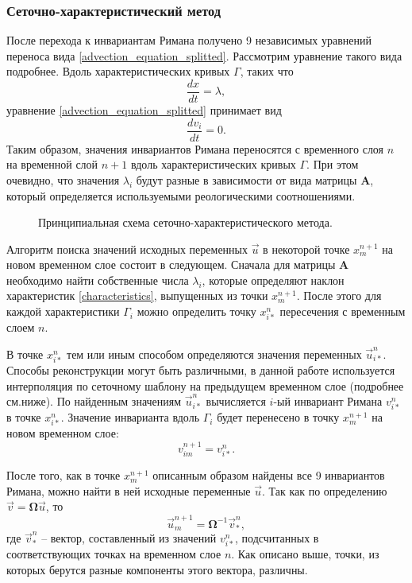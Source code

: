 \subsubsection{Сеточно-характеристический метод}
\label{sec:gcm_method_idea}

После перехода к инвариантам Римана получено 9 независимых уравнений переноса вида \ref{advection_equation_splitted}. Рассмотрим уравнение такого вида подробнее. Вдоль характеристических кривых $\Gamma$, таких что
\begin{equation}
\label{characteristics}
\frac{dx}{dt} = \lambda,
\end{equation}
уравнение \ref{advection_equation_splitted} принимает вид 
\begin{equation}
\label{characteristic_equation}
\frac{dv_i}{dt} = 0.
\end{equation}
Таким образом, значения инвариантов Римана переносятся с временного слоя $n$ на временной слой $n+1$ вдоль характеристических кривых $\Gamma$. При этом очевидно, что значения $\lambda_i$ будут разные в зависимости от вида матрицы $\mathbf A$, который определяется используемыми реологическими соотношениями.

\begin{figure}[h]
\caption{Принципиальная схема сеточно-характеристического метода.}
\end{figure}

Алгоритм поиска значений исходных переменных $\vec u$ в некоторой точке $x_m^{n+1}$ на новом временном слое состоит в следующем. Сначала для матрицы $\mathbf A$ необходимо найти собственные числа $\lambda_i$, которые определяют наклон характеристик \ref{characteristics}, выпущенных из точки $x_m^{n+1}$. После этого для каждой характеристики $\Gamma_i$ можно определить точку $x_{i*}^n$ пересечения с временным слоем $n$.

В точке $x_{i*}^n$ тем или иным способом определяются значения переменных $\vec u_{i*}^n$. Способы реконструкции могут быть различными, в данной работе используется интерполяция по сеточному шаблону на предыдущем временном слое (подробнее см.ниже). По найденным значениям $\vec u_{i*}^n$ вычисляется $i$-ый инвариант Римана $v_{i*}^n$ в точке $x_{i*}^n$. Значение инварианта вдоль $\Gamma_i$ будет перенесено в точку $x_m^{n+1}$ на новом временном слое:
\begin{equation}
v_{im}^{n+1} = v_{i*}^n.
\end{equation}

После того, как в точке $x_m^{n+1}$ описанным образом найдены все 9 инвариантов Римана, можно найти в ней исходные переменные $\vec u$. Так как по определению ${\vec v}=\mathbf\Omega{\vec u}$, то
\begin{equation}
{\vec u}_m^{n+1}=\mathbf\Omega^{-1}{\vec v}_*^n,
\end{equation}
где ${\vec v}_*^n$ -- вектор, составленный из значений $v_{i*}^n$, подсчитанных в соответствующих точках на временном слое $n$. Как описано выше, точки, из которых берутся разные компоненты этого вектора, различны.



